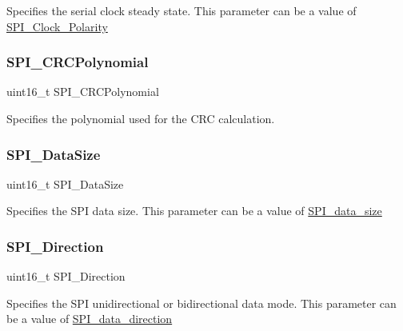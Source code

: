 Specifies the serial clock steady state. This parameter can be a value of \mbox{\hyperlink{group___s_p_i___clock___polarity}{S\+P\+I\+\_\+\+Clock\+\_\+\+Polarity}} \mbox{\label{struct_s_p_i___init_type_def_a1f0b3ef1e0062883db3ea3ef5690d0c2}} 
\subsubsection{\texorpdfstring{SPI\_CRCPolynomial}{SPI\_CRCPolynomial}}
{\footnotesize\ttfamily uint16\+\_\+t S\+P\+I\+\_\+\+C\+R\+C\+Polynomial}

Specifies the polynomial used for the C\+RC calculation. \mbox{\label{struct_s_p_i___init_type_def_a541e4cbd533e4102ffeffbe8388a38d6}} 
\subsubsection{\texorpdfstring{SPI\_DataSize}{SPI\_DataSize}}
{\footnotesize\ttfamily uint16\+\_\+t S\+P\+I\+\_\+\+Data\+Size}

Specifies the S\+PI data size. This parameter can be a value of \mbox{\hyperlink{group___s_p_i__data__size}{S\+P\+I\+\_\+data\+\_\+size}} \mbox{\label{struct_s_p_i___init_type_def_a485dbba7798a7ff3d00dfabba19584b8}} 
\subsubsection{\texorpdfstring{SPI\_Direction}{SPI\_Direction}}
{\footnotesize\ttfamily uint16\+\_\+t S\+P\+I\+\_\+\+Direction}

Specifies the S\+PI unidirectional or bidirectional data mode. This parameter can be a value of \mbox{\hyperlink{group___s_p_i__data__direction}{S\+P\+I\+\_\+data\+\_\+direction}} \mbox{\label{struct_s_p_i___init_type_def_a5e5761d0b588ff75ad15adb2adf9e7e7}} 
